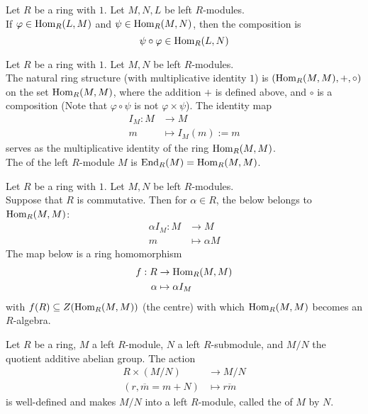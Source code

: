 \begin{proposition}
Let $R$ be a ring with $1$. Let $M, N, L$ be left $R$-modules.\\
If $\varphi \in \textnormal{Hom}_R(L,M)$ and $\psi \in \textnormal{Hom}_R(M,N)$, then the composition is
\begin{equation}
\psi \circ \varphi \in \textnormal{Hom}_R(L,N) \nonumber
\end{equation}
\end{proposition}

\begin{proposition}
Let $R$ be a ring with $1$. Let $M, N$ be left $R$-modules.\\
The natural ring structure (with multiplicative identity $1$) is $(\textnormal{Hom}_R(M,M), +, \circ)$ on the set $\textnormal{Hom}_R(M,M)$, where the addition $+$ is defined above, and $\circ$ is a composition (Note that $\varphi \circ \psi$ is not $\varphi \times \psi$). The identity map
\begin{align}
I_M: M &\rightarrow M \nonumber \\
m &\mapsto I_M(m) := m \nonumber
\end{align}
serves as the multiplicative identity of the ring $\textnormal{Hom}_R(M,M)$.\\
The  of the left $R$-module $M$ is $\textnormal{End}_R(M) = \textnormal{Hom}_R(M,M)$.
\end{proposition}

\begin{proposition}
Let $R$ be a ring with $1$. Let $M, N$ be left $R$-modules.\\
Suppose that $R$ is commutative. Then for $\alpha \in R$, the  below belongs to $\textnormal{Hom}_R(M,M)$:
\begin{align}
\alpha I_M: M &\rightarrow M \nonumber \\
m &\mapsto \alpha M \nonumber
\end{align}
The map below is a ring homomorphism
\begin{align}
f: R &\rightarrow \textnormal{Hom}_R(M,M) \nonumber \\
\alpha &\mapsto \alpha I_M \nonumber
\end{align}
with $f(R) \subseteq Z(\textnormal{Hom}_R(M,M))$ (the centre) with which $\textnormal{Hom}_R(M,M)$ becomes an $R$-algebra.
\end{proposition}

\begin{proposition}
Let $R$ be a ring, $M$ a left $R$-module, $N$ a left $R$-submodule, and $M/N$ the quotient additive abelian group. The action
\begin{align}
R \times (M/N) &\rightarrow M/N \nonumber \\
(r, \overline{m} = m+N) &\mapsto \overline{rm} \nonumber
\end{align}
is well-defined and makes $M/N$ into a left $R$-module, called the  of $M$ by $N$.
\end{proposition}

